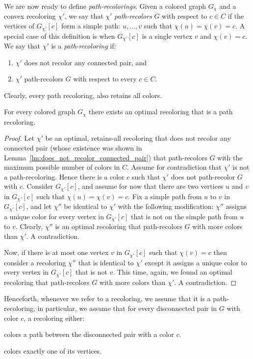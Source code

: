We are now ready to define \emph{path-recolorings}.
%
Given a colored graph $G_\chi$ and a convex recoloring $\chi'$, 
we say that $\chi'$ \emph{path-recolors} $G$ with respect to $c \in C$ 
if the vertices of $G_{\chi'}[c]$ form a simple path: 
$u, \dots, v$ such that $\chi(u) = \chi(v) = c$.
%
A special case of this definition is when  $G_{\chi'}[c]$ 
is a single vertex $v$ and $\chi(v) = c$.
%
We say that $\chi'$ is a \emph{path-recoloring} if:
\begin{enumerate}
	\item $\chi'$ does not recolor any connected pair, and 
	\item $\chi'$ path-recolors $G$ with respect to every $c \in C$.
\end{enumerate}
Clearly, every path recoloring, also retains all colors.

\begin{lemma}
\label{lm:optimal_path_recoloring}
For every colored graph $G_\chi$ 
there exists an optimal recoloring that is a path recoloring.
\end{lemma}

\begin{proof}
Let $\chi'$ be an optimal, 
retains-all recoloring that does not recolor any connected pair 
(whose existence was shown in Lemma~\ref{lm:does_not_recolor_connected_pair}) 
that path-recolors $G$ with the maximum possible number of colors in $C$. 
%
Assume for contradiction that $\chi'$ is not a path-recoloring.  
%
Hence there is a color $c$ such that $\chi'$ does not path-recolor $G$ with $c$.
%
Consider $G_{\chi'}[c]$, 
and assume for now that there are two vertices $u$
and $v$ in $G_{\chi'}[c]$ such that $\chi(u) = \chi(v) = c$.  
%
Fix a simple path from $u$ to $v$ in $G_{\chi'}[c]$, 
and let $\chi''$ be identical to $\chi'$ with the following modification: 
$\chi''$ assigns a unique color for every vertex in $G_{\chi'}[c]$ 
that is not on the simple path from $u$ to $v$.
%
Clearly, 
$\chi''$ is an optimal recoloring that path-recolors $G$ with more colors than $\chi'$.  
%
A contradiction.
	
Now,
if there is at most one vertex $v$ in $G_{\chi'}[c]$ such that $\chi(v) = c$ 
then consider a recoloring $\chi''$ that is identical to $\chi'$ 
except it assigns a unique color to every vertex in $G_{\chi'}[c]$ that is not $v$.
%
This time, 
again, 
we found an optimal recoloring that path-recolors $G$ with more colors than $\chi'$.  
%
A contradiction.
{}\end{proof}

Henceforth, 
whenever we refer to a recoloring, 
we assume that it is a path-recoloring, 
in particular, 
we assume that for every disconnected pair in $G$ with color $c$, 
a recoloring either:
\begin{inparaenum}[(i)]
	\item colors a path between the disconnected pair with a color $c$.
	\item colors exactly one of its vertices. 
\end{inparaenum}